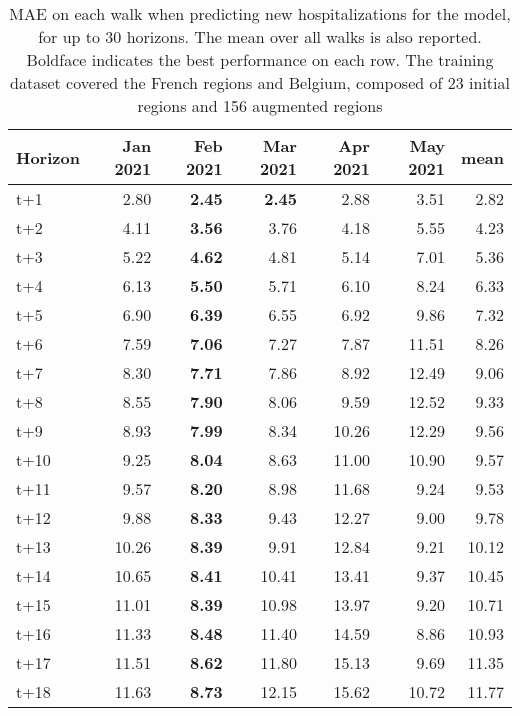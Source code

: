 \begin{table}[H]
\centering
\caption{MAE on each walk when predicting new hospitalizations for the model, for up to 30 horizons. The mean over all walks is also reported. Boldface indicates the best performance on each row. The training dataset covered the French regions and Belgium, composed of 23 initial regions and 156 augmented regions }
\label{tab:MAE_walk_assembly_2}
\begin{tabular}{lrrrrrr}
\toprule
Horizon &  Jan 2021 &  Feb 2021 &  Mar 2021 &  Apr 2021 &  May 2021 &  mean \\
\midrule
t+1  & 2.80  & \textbf{2.45}  & \textbf{2.45}  & 2.88  & 3.51  & 2.82  \\
t+2  & 4.11  & \textbf{3.56}  & 3.76  & 4.18  & 5.55  & 4.23  \\
t+3  & 5.22  & \textbf{4.62}  & 4.81  & 5.14  & 7.01  & 5.36  \\
t+4  & 6.13  & \textbf{5.50}  & 5.71  & 6.10  & 8.24  & 6.33  \\
t+5  & 6.90  & \textbf{6.39}  & 6.55  & 6.92  & 9.86  & 7.32  \\
t+6  & 7.59  & \textbf{7.06}  & 7.27  & 7.87  & 11.51  & 8.26  \\
t+7  & 8.30  & \textbf{7.71}  & 7.86  & 8.92  & 12.49  & 9.06  \\
t+8  & 8.55  & \textbf{7.90}  & 8.06  & 9.59  & 12.52  & 9.33  \\
t+9  & 8.93  & \textbf{7.99}  & 8.34  & 10.26  & 12.29  & 9.56  \\
t+10  & 9.25  & \textbf{8.04}  & 8.63  & 11.00  & 10.90  & 9.57  \\
t+11  & 9.57  & \textbf{8.20}  & 8.98  & 11.68  & 9.24  & 9.53  \\
t+12  & 9.88  & \textbf{8.33}  & 9.43  & 12.27  & 9.00  & 9.78  \\
t+13  & 10.26  & \textbf{8.39}  & 9.91  & 12.84  & 9.21  & 10.12  \\
t+14  & 10.65  & \textbf{8.41}  & 10.41  & 13.41  & 9.37  & 10.45  \\
t+15  & 11.01  & \textbf{8.39}  & 10.98  & 13.97  & 9.20  & 10.71  \\
t+16  & 11.33  & \textbf{8.48}  & 11.40  & 14.59  & 8.86  & 10.93  \\
t+17  & 11.51  & \textbf{8.62}  & 11.80  & 15.13  & 9.69  & 11.35  \\
t+18  & 11.63  & \textbf{8.73}  & 12.15  & 15.62  & 10.72  & 11.77  \\

\end{tabular}
\end{table}
